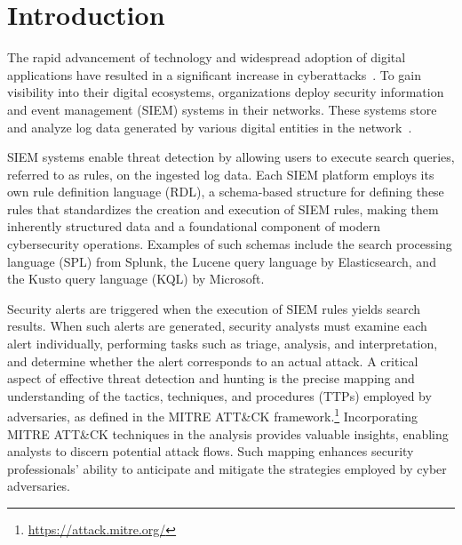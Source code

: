 \section{\label{sec:intro}Introduction}


The rapid advancement of technology and widespread adoption of digital applications have resulted in a significant increase in cyberattacks~\cite{checkpoint}.
To gain visibility into their digital ecosystems, organizations deploy security information and event management (SIEM) systems in their networks. 
These systems store and analyze log data generated by various digital entities in the network~\cite{exabeam}.

SIEM systems enable threat detection by allowing users to execute search queries, referred to as rules, on the ingested log data. 
Each SIEM platform employs its own rule definition language (RDL), a schema-based structure for defining these rules that standardizes the creation and execution of SIEM rules, making them inherently structured data and a foundational component of modern cybersecurity operations.
Examples of such schemas include the search processing language (SPL) from Splunk, the Lucene query language by Elasticsearch, and the Kusto query language (KQL) by Microsoft. 

Security alerts are triggered when the execution of SIEM rules yields search results. 
When such alerts are generated, security analysts must examine each alert individually, performing tasks such as triage, analysis, and interpretation, and determine whether the alert corresponds to an actual attack. 
A critical aspect of effective threat detection and hunting is the precise mapping and understanding of the tactics, techniques, and procedures (TTPs) employed by adversaries, as defined in the MITRE ATT\&CK framework.\footnote{\url{https://attack.mitre.org/}} 
Incorporating MITRE ATT\&CK techniques in the analysis provides valuable insights, enabling analysts to discern potential attack flows. 
Such mapping enhances security professionals' ability to anticipate and mitigate the strategies employed by cyber adversaries.

